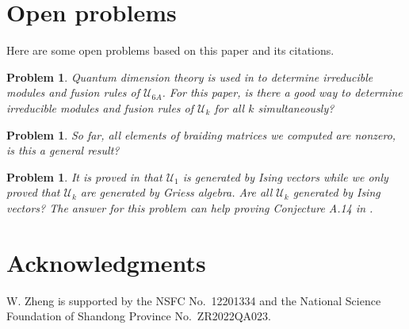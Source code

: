 \documentclass{article}
\newtheorem{problem}[lemma]{Problem}
\begin{document}
\section{Open problems}
Here are some open problems based on 
this paper and its citations.

\begin{problem}
	Quantum dimension theory \cite{DJX} is used
	in \cite{DJY} to determine irreducible modules and fusion rules of $\mathcal{U}_{6A}$. 
	For this paper, is there a good way to determine irreducible modules and fusion rules of $\mathcal{U}_k$ for all $k$ simultaneously?
\end{problem}

\begin{problem}
	So far, all elements of braiding matrices we computed are nonzero, 
	is this a general result?
\end{problem}

\begin{problem}
	It is proved in \cite{LYY, JZ} that $\mathcal{U}_1$ is generated by Ising vectors while
	we only proved that $\mathcal{U}_k$ are generated by Griess algebra. 
	Are all $\mathcal{U}_k$ generated by Ising vectors?
	The answer for this problem can help proving Conjecture A.14 in \cite{LY}.
\end{problem}

\section*{Acknowledgments}
W. Zheng is supported by the NSFC No.~12201334 and the National Science Foundation of Shandong Province No.~ZR2022QA023.


\end{document}

